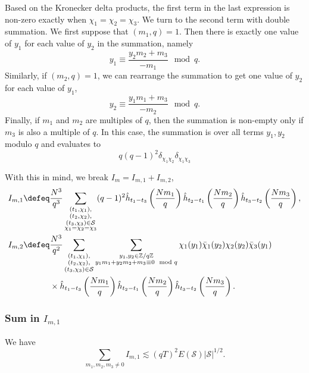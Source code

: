 Based on the Kronecker delta products, the first term in the last expression is non-zero exactly when $\chi_1=\chi_2=\chi_3$. We turn to the second term with double summation. 
We first suppose that $(m_1,q)=1$. Then there is exactly one value of $y_1$ for each value of $y_2$ in the summation, namely \[
y_1\equiv \frac{y_2m_2+m_3}{-m_1} \mod q.
\]
Similarly, if $(m_2,q)=1$, we can rearrange the summation to get one value of $y_2$ for each value of $y_1$,\[
y_2\equiv \frac{y_1m_1+m_3}{-m_2} \mod q.
\]
Finally, if $m_1$ and $m_2$ are multiples of $q$, then the summation is non-empty only if $m_3$ is also a multiple of $q$. In this case, the summation is over all terms $y_1,y_2$ modulo $q$ and evaluates to \[
q (q-1)^2\delta_{\chi_1\chi_2}\delta_{\chi_1\chi_3}
\] 

With this in mind, we break $I_m=I_{m,1}+I_{m,2}$,\begin{align*}
I_{m,1}\defeq&\frac{N^3}{q^3}\sum_{\substack{(t_1,\chi_1),\\(t_2,\chi_2),\\(t_3,\chi_3)\in\mathcal{S}\\
\chi_1=\chi_2=\chi_3}}(q-1)^2 \hat{h}_{t_1-t_3}\left(\frac{Nm_1}{q}\right)\hat{h}_{t_2-t_1}\left(\frac{Nm_2}{q}\right)\hat{h}_{t_3-t_2}\left(\frac{Nm_3}{q}\right),\\
I_{m,2}\defeq&\frac{N^3}{q^2}\sum_{\substack{(t_1,\chi_1),\\(t_2,\chi_2),\\(t_3,\chi_3)\in\mathcal{S}}} \sum_{\substack{y_1,y_2 \in\mathbb{Z}/q\mathbb{Z} \\ y_1m_1+y_2m_2+m_3\equiv 0 \mod q}}\chi_1(y_1)\bar{\chi}_1(y_2)\chi_2(y_2)\bar{\chi}_3(y_1)\\
&\times \hat{h}_{t_1-t_3}\left(\frac{Nm_1}{q}\right)\hat{h}_{t_2-t_1}\left(\frac{Nm_2}{q}\right)\hat{h}_{t_3-t_2}\left(\frac{Nm_3}{q}\right).
\end{align*}

\subsubsection{Sum in $I_{m,1}$}
\begin{proposition}  \label{im1bound}
    We have \[
    \sum_{m_1,m_2,m_3\neq 0} I_{m,1}\lesssim (qT)^2E(\mathcal{S})|\mathcal{S}|^{1/2}.
    \]
\end{proposition}

